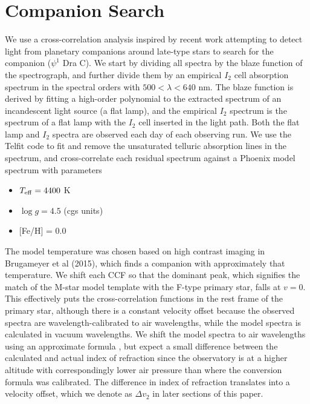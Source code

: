 \documentclass[twocolumn]{emulateapj}
\begin{document}
 
 
 


\section{Companion Search}
\label{sec:method}

We use a cross-correlation analysis inspired by recent work attempting to detect light from planetary companions around late-type stars \citep{Gullikson2013, Martins2013} to search for the companion ($\psi^1$ Dra C). We start by dividing all spectra by the blaze function of the spectrograph, and further divide them by an empirical $I_2$ cell absorption spectrum in the spectral orders with $500 < \lambda < 640$ nm. The blaze function is derived by fitting a high-order polynomial to the extracted spectrum of an incandescent light source (a flat lamp), and the empirical $I_2$ spectrum is the spectrum of a flat lamp with the $I_2$ cell inserted in the light path. Both the flat lamp and $I_2$ spectra are observed each day of each observing run. We use the Telfit code \citep{Gullikson2014} to fit and remove the unsaturated telluric absorption lines in the spectrum, and cross-correlate each residual spectrum against a Phoenix model spectrum \citep{Husser2013} with parameters

\begin{itemize}
\item $T_{\rm eff} = 4400$ K
\item $\log{g} = 4.5$ (cgs units)
\item {[}Fe/H{]} = 0.0
\end{itemize}

The model temperature was chosen based on high contrast imaging in Brugameyer et al (2015), which finds a companion with approximately that temperature. We shift each CCF so that the dominant peak, which signifies the match of the M-star model template with the F-type primary star, falls at $v=0$. This effectively puts the cross-correlation functions in the rest frame of the primary star, although there is a constant velocity offset because the observed spectra are wavelength-calibrated to air wavelengths, while the model spectra is calculated in vacuum wavelengths. We shift the model spectra to air wavelengths using an approximate formula \citep{Ciddor96}, but expect a small difference between the calculated and actual index of refraction since the observatory is at a higher altitude with correspondingly lower air pressure than where the conversion formula was calibrated. The difference in index of refraction translates into a velocity offset, which we denote as $\Delta v_2$ in later sections of this paper.
\end{document}
